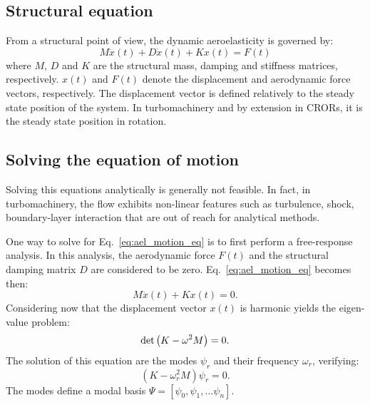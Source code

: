 
\subsection{Structural equation}
\label{sub:structural_equation}

From a structural point of view, 
the dynamic aeroelasticity is governed by:
\begin{equation}
	M \ddot{x}(t) + D \dot{x}(t) + K x(t) = F(t)
	\label{eq:ael_motion_eq}
\end{equation}
where $M$, $D$ and $K$ are the structural mass, damping 
and stiffness matrices, respectively.
$x(t)$ and $F(t)$ denote the displacement 
and aerodynamic force vectors, respectively. The displacement
vector is defined relatively to the 
steady state position of the system. In turbomachinery
and by extension in CRORs, it is the steady state position
in rotation.

\subsection{Solving the equation of motion}
\label{sub:solving_eq_ael}

Solving this equations analytically is generally 
not feasible. In fact, in turbomachinery, 
the flow exhibits non-linear features such as turbulence, shock,
boundary-layer interaction that are out of reach for
analytical methods.

One way to solve for Eq.~\eqref{eq:ael_motion_eq}
is to first perform a free-response analysis.
In this analysis, the aerodynamic force $F(t)$ and
the structural damping matrix $D$ are considered to be zero.
Eq.~\eqref{eq:ael_motion_eq} becomes then:
\begin{equation}
	M \ddot{x}(t) + K x(t) = 0.
	\label{eq:ael_motion_eq_free_response}
\end{equation}
Considering now that the displacement vector $x(t)$ is harmonic
yields the eigen-value problem:
\begin{equation}
	\mdet \left(K - \omega^2 M  \right) = 0.
	\label{eq:ael_motion_eq_eigen_value}
\end{equation}
The solution of this equation are the modes $\psi_r$
and their frequency $\omega_r$, verifying:
\begin{equation}
	\left(K - \omega_r^2 M  \right) \psi_r = 0.
\end{equation}
The modes define a modal basis 
$\Psi = [\psi_0, \psi_1, \dots \psi_n]$.

